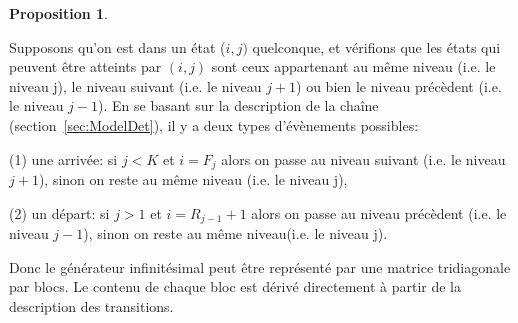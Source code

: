 \documentclass[conference]{IEEEtran}
\newtheorem{prosi}{Proposition}
\begin{document}
\begin{prosi}
\end{prosi}

\begin{IEEEproof}

Supposons qu'on est dans un état ($i,j)$ quelconque, et vérifions que les états qui peuvent être atteints par $(i,j)$ sont ceux appartenant au même niveau (i.e. le niveau j), le niveau suivant (i.e. le niveau $j+1$) ou bien le niveau précèdent (i.e. le niveau $j-1$). En se basant sur la description de la chaîne (section~\ref{sec:ModelDet}), il y a deux types d'évènements possibles:

(1) une arrivée: 
si $j<K$ et $i=F_{j}$ alors on passe au niveau suivant (i.e. le niveau $j+1$), 
sinon on reste au même niveau (i.e. le niveau j),

(2) un départ:
si $j>1$ et $i=R_{j-1}+1$ alors on passe au niveau précèdent (i.e. le niveau $j-1$),
sinon on reste au même niveau(i.e. le niveau j).

Donc le générateur infinitésimal peut être représenté par une matrice tridiagonale par blocs. Le contenu de chaque bloc est dérivé directement à partir de la description des transitions.
\end{IEEEproof}
\end{document}
